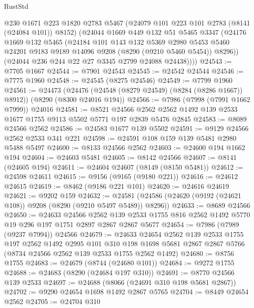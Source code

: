 \begin{lexlean}{RustStd}
\begin{coremodule}
        @230
        @1671
        @223
        @1820
        @2783
        @5467
        (@24079 @101 @223 @101 @2783 (@8141 (@24084 @101)) @8152)
        (@24044
          @1669
          @449
          @132
          @51
          @5465
          @3347
          (@24176
            @1669
            @132
            @5465
            (@24184
              @101
              @143
              @132
              @5369
              @2980
              @5453
              @5460
              @24201
              @9183
              @9189
              @14096
              @9208
              (@8290 (@9210 @5460 @5454))
              @8296))
          (@24044 @236 @244 @22 @27 @3345 @2799 @24088 @24438))))
@24543 := @7705 @1667
@24544 := @7901 @24543
@24545 := @24542 @24544
@24546 := @7775 @1960
@24548 := @24545 (@8275 @24546)
@24549 := @7799 @1960
@24561 := @24473
    (@24476 (@24548 (@8279 @24549) (@8284 (@8286 @1667)) @8912))
    (@8290 (@8300 @24016 @194))
@24566 := @7986 (@7998 (@7991 @1662 @7999)) @24016
@24581 := @8521
    @24566
    @2562
    @2562
    @1492
    @139
    @2533
    @1677
    @1755
    @9113
    @5502
    @5771
    @197
    @2839
    @5476
    @2845
@24583 := @8089 @24566 @2562
@24586 := @24583 @1677 @139 @5502
@24591 := @9129 @24566 @2562 @2533 @341 @221
@24598 := @24591 @108 @159 @139 @5481 @2980 @5488 @5497
@24600 := @8133 @24566 @2562
@24603 := @24600 @194 @1662 @194
@24604 := @24603 @5481
@24605 := @8142 @24566
@24607 := @8141 (@24605 @194)
@24611 := @24604 @24607 (@8149 (@8150 @5481))
@24612 := @24598 @24611
@24615 := @9156 (@9165 (@9180 @221))
@24616 := @24612 @24615
@24619 := @8462 (@9186 @221 @101)
@24620 := @24616 @24619
@24621 := @9202 @159
@24632 := @24581 (@24586 (@24620 (@9192 (@24621 @108)) @9208 (@8290 (@9210 @5497 @5489)) @8296))
@24633 := @8689 @24566
@24650 := @24633
    @24566
    @2562
    @139
    @2533
    @1755
    @816
    @2562
    @1492
    @5770
    @19
    @296
    @197
    @1751
    @2897
    @2867
    @2867
    @5677
@24654 := @7986 (@7989 (@9237 @7994)) @24566
@24679 := @24633
    @24654
    @2562
    @139
    @2533
    @1755
    @197
    @2562
    @1492
    @2995
    @101
    @310
    @198
    @1698
    @5681
    @2867
    @2867
    @5766
    (@8734 @24566 @2562 @139 @2533 @1755 @2562 @1492)
@24680 := @8756 @1755
@24683 := @24679 (@8744 (@24680 @101))
@24684 := @9272 @1755
@24688 := @24683 (@8290 (@24684 @197 @310))
@24691 := @8770 @24566 @139 @2533
@24697 := @24688 (@8066 (@24691 @310 @198 @5681 @2867))
@24702 := @9290 @24654 @1698 @1492 @2867 @5765
@24704 := @8449 @24654 @2562
@24705 := @24704 @310

\end{coremodule}
\end{lexlean}
